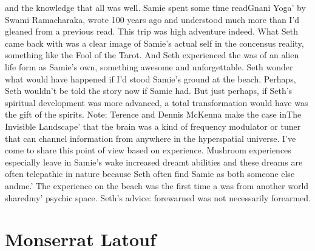 \documentclass[12pt]{book}
\begin{document}
and the knowledge that all was well. Samie spent some time readGnani Yoga' by Swami Ramacharaka, wrote 100 years ago and understood much more than I'd gleaned from a previous read. This trip was high adventure indeed. What Seth came back with was a clear image of Samie's actual self in the concensus reality, something like the Fool of the Tarot. And Seth experienced the was of an alien life form as Samie's own, something awesome and unforgettable. Seth wonder what would have happened if I'd stood Samie's ground at the beach. Perhaps, Seth wouldn't be told the story now if Samie had. But just perhaps, if Seth's spiritual development was more advanced, a total transformation would have was the gift of the spirits. Note: Terence and Dennis McKenna make the case inThe Invisible Landscape' that the brain was a kind of frequency modulator or tuner that can channel information from anywhere in the hyperspatial universe. I've come to share this point of view based on experience. Mushroom experiences especially leave in Samie's wake increased dreamt abilities and these dreams are often telepathic in nature because Seth often find Samie as both someone else andme.' The experience on the beach was the first time a was from another world sharedmy' psychic space. Seth's advice: forewarned was not necessarily forearmed.



\chapter{Monserrat Latouf}
\end{document}

